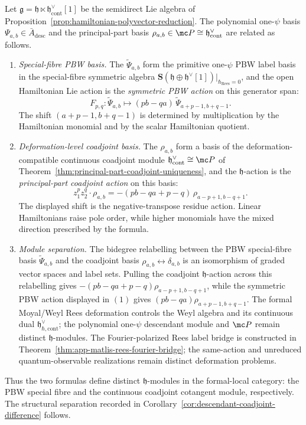 \documentclass[11pt]{memoir}
\begin{document}
\begin{thm}\label{thm:pbw-vs-deformation}
  Let $\mathfrak g=\mathfrak h\ltimes\mathfrak h^\vee_{\mathrm{cont}}[1]$
  be the semidirect Lie algebra of
  Proposition~\ref{prop:hamiltonian-polyvector-reduction}. The
  polynomial one-$\psi$ basis $\Psi_{a,b}\in\bar A_{\mathrm{desc}}$ and
  the principal-part basis
  $\rho_{a,b}\in\mc P\cong\mathfrak h^\vee_{\mathrm{cont}}$ are related
  as follows.
  \begin{enumerate}
    \item \emph{Special-fibre PBW basis.} The $\widetilde\Psi_{a,b}$
      form the primitive one-\(\psi\) PBW label basis in
      the special-fibre symmetric algebra
      $\mathbf S(\mathfrak h\oplus\mathfrak h^\vee[1])\big|_{\hbar_{\mathrm{Rees}}=0}$,
      and the open Hamiltonian Lie action is the \emph{symmetric PBW action}
      on this generator span:
      $$F_{p,q}:\widetilde\Psi_{a,b}\longmapsto
        (pb-qa)\,\widetilde\Psi_{a+p-1,b+q-1}.$$
      The shift $(a+p-1,b+q-1)$ is determined by multiplication by the
      Hamiltonian monomial and by the scalar Hamiltonian quotient.
    \item \emph{Deformation-level coadjoint basis.} The $\rho_{a,b}$
      form a basis of the deformation-compatible continuous coadjoint
      module $\mathfrak h^\vee_{\mathrm{cont}}\cong\mc P$ of
      Theorem~\ref{thm:principal-part-coadjoint-uniqueness}, and the
      $\mathfrak h$-action is the \emph{principal-part coadjoint action}
      on this basis:
      $$z_1^pz_2^q\cdot\rho_{a,b}=
        -(pb-qa+p-q)\,\rho_{a-p+1,b-q+1}.$$
      The displayed shift is the negative-transpose residue action.
      Linear Hamiltonians raise pole order, while higher monomials have
      the mixed direction prescribed by the formula.
    \item \emph{Module separation.} The
      bidegree relabelling between the PBW special-fibre basis
      $\widetilde\Psi_{a,b}$ and the coadjoint basis
      $\rho_{a,b}\leftrightarrow\delta_{a,b}$ is an isomorphism of
	      graded vector spaces and label sets. Pulling the coadjoint
	      $\mathfrak h$-action across this relabelling gives
	      $-(pb-qa+p-q)\rho_{a-p+1,b-q+1}$, while the symmetric PBW
	      action displayed in $(1)$ gives
	      $(pb-qa)\rho_{a+p-1,b+q-1}$. The formal Moyal/Weyl Rees
	      deformation controls the Weyl algebra and its continuous dual
	      $\mathfrak h^\vee_{\hbar,\mathrm{cont}}$; the polynomial
	      one-$\psi$ descendant module and $\mc P$ remain distinct
	      $\mathfrak h$-modules.
		      The Fourier-polarized Rees label bridge is constructed in
		      Theorem~\ref{thm:app-matlis-rees-fourier-bridge}; the
		      same-action and unreduced quantum-observable realizations remain
		      distinct deformation problems.
  \end{enumerate}
  Thus the two formulas define distinct
  $\mathfrak h$-modules in the formal-local category: the
  PBW special fibre and the continuous coadjoint cotangent module,
  respectively.
  The structural separation recorded in
  Corollary~\ref{cor:descendant-coadjoint-difference} follows.
\end{thm}
\end{document}
